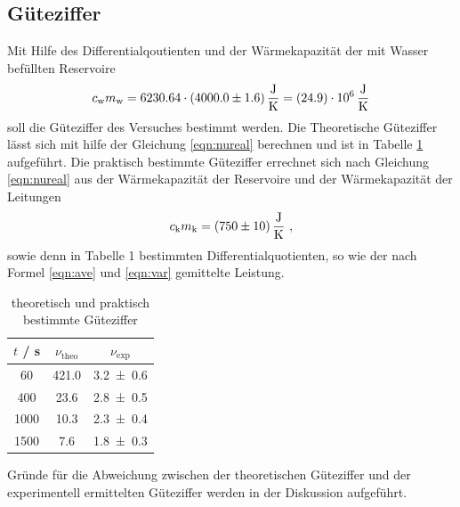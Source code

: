 \subsection{Güteziffer}
Mit Hilfe des Differentialqoutienten und der Wärmekapazität der mit Wasser befüllten Reservoire
\begin{equation}
  c_\text{w} m_\text{w} = 6230.64 \cdot (\num{4000 +- 1.6}) \, \frac{\text{J}}{\text{K}} = (\num{24.9 +- 0.0}) \cdot 10^6 \, \frac{\text{J}}{\text{K}}
  \label{eqn:WC}
\end{equation}
soll die Güteziffer des Versuches bestimmt werden. Die Theoretische Güteziffer lässt sich mit hilfe der Gleichung \ref{eqn:nureal} berechnen und ist in Tabelle \ref{tab:gueteziffer} aufgeführt. Die praktisch bestimmte Güteziffer errechnet sich nach Gleichung \ref{eqn:nureal} aus der Wärmekapazität der Reservoire und der Wärmekapazität der Leitungen
\begin{equation}
  c_\text{k} m_\text{k} = (\num{750 +- 10}) \, \frac{\text{J}}{\text{K}} \ ,
  \label{eqn:Res}
\end{equation}
sowie denn in Tabelle 1 bestimmten Differentialquotienten, so wie der nach Formel \ref{eqn:ave} und \ref{eqn:var} gemittelte Leistung.
\begin{table}
  \centering
  \begin{tabular}{c c c}
    \toprule
    $t$ / s & $\nu_\text{theo}$ & $\nu_\text{exp}$ \\
    \midrule
    60	 & 421.0 & \num{3.2 +- 0.6} 	\\
    400  & 23.6	 & \num{2.8 +- 0.5} 	\\
    1000 & 10.3	 & \num{2.3 +- 0.4}	\\
    1500 & 7.6	 & \num{1.8 +- 0.3} 	\\
    \bottomrule
  \end{tabular}
  \caption{theoretisch und praktisch bestimmte Güteziffer}
  \label{tab:gueteziffer}
\end{table}
Gründe für die Abweichung zwischen der theoretischen Güteziffer und der experimentell ermittelten Güteziffer werden in der Diskussion aufgeführt.
